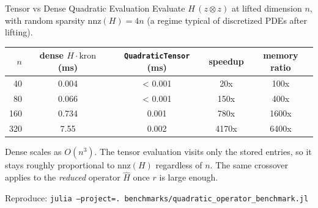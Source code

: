 \documentclass[aspectratio=169,10pt]{beamer}
\begin{document}
\begin{frame}{Tensor vs Dense Quadratic Evaluation}
  Evaluate $H \, (z \otimes z)$ at lifted dimension $n$, with random sparsity $\mathrm{nnz}(H) = 4n$ (a regime typical of discretized PDEs after lifting).

  \medskip
  \begin{center}
    \footnotesize
    \begin{tabular}{rcccc}
      \toprule
      $n$ & dense $H \cdot \mathrm{kron}$ (ms) & \texttt{QuadraticTensor} (ms) & speedup & memory ratio \\
      \midrule
      40   & 0.004  & < 0.001 & 20x   & 100x   \\
      80   & 0.066  & < 0.001 & 150x  & 400x   \\
      160  & 0.734  & 0.001   & 780x  & 1600x  \\
      320  & 7.55   & 0.002   & 4170x & 6400x  \\
      \bottomrule
    \end{tabular}
  \end{center}

  \medskip
  Dense scales as $O(n^3)$. The tensor evaluation visits only the stored entries, so it stays roughly proportional to $\mathrm{nnz}(H)$ regardless of $n$. The same crossover applies to the \emph{reduced} operator $\widehat{H}$ once $r$ is large enough.

  \medskip
  Reproduce: \texttt{julia --project=. benchmarks/quadratic\_operator\_benchmark.jl}
\end{frame}

\end{document}
